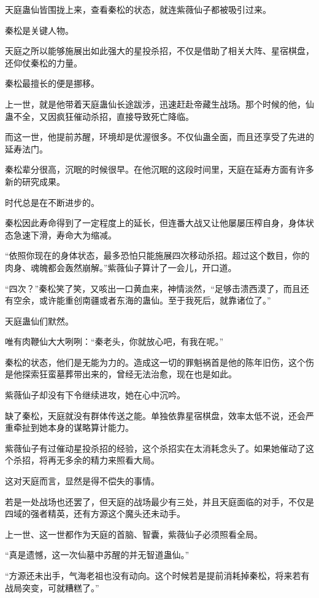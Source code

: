 \begin{this_body}
天庭蛊仙皆围拢上来，查看秦松的状态，就连紫薇仙子都被吸引过来。

秦松是关键人物。

天庭之所以能够施展出如此强大的星投杀招，不仅是借助了相关大阵、星宿棋盘，还仰仗秦松的力量。

秦松最擅长的便是挪移。

上一世，就是他带着天庭蛊仙长途跋涉，迅速赶赴帝藏生战场。那个时候的他，仙蛊不全，又因疯狂催动杀招，直接导致死亡降临。

而这一世，他提前苏醒，环境却是优渥很多。不仅仙蛊全面，而且还享受了先进的延寿法门。

秦松辈分很高，沉眠的时候很早。在他沉眠的这段时间里，天庭在延寿方面有许多新的研究成果。

时代总是在不断进步的。

秦松因此寿命得到了一定程度上的延长，但连番大战又让他屡屡压榨自身，身体状态急速下滑，寿命大为缩减。

“依照你现在的身体状态，最多恐怕只能施展四次移动杀招。超过这个数目，你的肉身、魂魄都会轰然崩解。”紫薇仙子算计了一会儿，开口道。

“四次？”秦松笑了笑，又咳出一口黄血来，神情淡然，“足够击溃西漠了，而且还有空余，或许能重创南疆或者东海的蛊仙。至于我死后，就靠诸位了。”

天庭蛊仙们默然。

唯有肉鞭仙大大咧咧：“秦老头，你就放心吧，有我在呢。”

秦松的状态，他们是无能为力的。造成这一切的罪魁祸首是他的陈年旧伤，这个伤是他探索狂蛮墓葬带出来的，曾经无法治愈，现在也是如此。

紫薇仙子却没有下令继续进攻，她在心中沉吟。

缺了秦松，天庭就没有群体传送之能。单独依靠星宿棋盘，效率太低不说，还会严重牵扯到她本身的谋略算计能力。

紫薇仙子有过催动星投杀招的经验，这个杀招实在太消耗念头了。如果她催动了这个杀招，将再无多余的精力来照看大局。

这对天庭而言，显然是得不偿失的事情。

若是一处战场也还罢了，但天庭的战场最少有三处，并且天庭面临的对手，不仅是四域的强者精英，还有方源这个魔头还未动手。

上一世、这一世都作为天庭的首脑、智囊，紫薇仙子必须照看全局。

“真是遗憾，这一次仙墓中苏醒的并无智道蛊仙。”

“方源还未出手，气海老祖也没有动向。这个时候若是提前消耗掉秦松，将来若有战局突变，可就糟糕了。”


\end{this_body}
